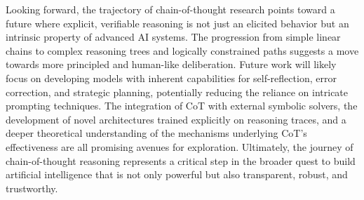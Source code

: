 \documentclass[11pt]{article}
\begin{document}
Looking forward, the trajectory of chain-of-thought research points toward a future where explicit, verifiable reasoning is not just an elicited behavior but an intrinsic property of advanced AI systems. The progression from simple linear chains to complex reasoning trees and logically constrained paths suggests a move towards more principled and human-like deliberation. Future work will likely focus on developing models with inherent capabilities for self-reflection, error correction, and strategic planning, potentially reducing the reliance on intricate prompting techniques. The integration of CoT with external symbolic solvers, the development of novel architectures trained explicitly on reasoning traces, and a deeper theoretical understanding of the mechanisms underlying CoT's effectiveness are all promising avenues for exploration. Ultimately, the journey of chain-of-thought reasoning represents a critical step in the broader quest to build artificial intelligence that is not only powerful but also transparent, robust, and trustworthy.
\end{document}
